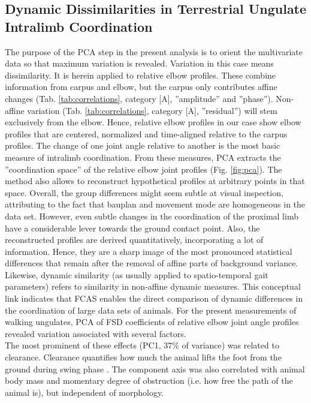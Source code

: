 \documentclass[10pt, a4paper]{article}
\begin{document}
\begin{linenumbers}[1]
\subsection*{Dynamic Dissimilarities in Terrestrial Ungulate Intralimb Coordination}
The purpose of the PCA step in the present analysis is to orient the multivariate data so that maximum variation is revealed. 
Variation in this case means dissimilarity. 
It is herein applied to relative elbow profiles. 
These combine information from carpus and elbow, but the carpus only contributes affine changes (Tab. \ref{tab:correlations}, category [A], ''amplitude'' and ''phase'').  
Non-affine variation (Tab. \ref{tab:correlations}, category [A], ''residual'') will stem exclusively from the elbow. 
Hence, relative elbow profiles in our case show elbow profiles that are centered, normalized and time-aligned relative to the carpus profiles. 
The change of one joint angle relative to another is the most basic measure of intralimb coordination. 
From these measures, PCA extracts the ''coordination space'' of the relative elbow joint profiles (Fig. \ref{fig:pca}). 
The method also allows to reconstruct hypothetical profiles at arbitrary points in that space. 
Overall, the group differences might seem subtle at visual inspection, attributing to the fact that bauplan and movement mode are homogeneous in the data set. 
However, even subtle changes in the coordination of the proximal limb have a considerable lever towards the ground contact point. 
Also, the reconstructed profiles are derived quantitatively, incorporating a lot of information. 
Hence, they are a sharp image of the most pronounced statistical differences that remain after the removal of affine parts of background variance. 
Likewise, dynamic similarity (as usually applied to spatio-temporal gait parameters) refers to similarity in non-affine dynamic measures. 
This conceptual link indicates that FCAS enables the direct comparison of dynamic differences in the coordination of large data sets of animals. 
For the present measurements of walking ungulates, PCA of FSD coefficients of relative elbow joint angle profiles revealed variation associated with several factors. 
\medskip\\The most prominent of these effects (PC1, $37\%$ of variance) was related to clearance. 
Clearance quantifies how much the animal lifts the foot from the ground during swing phase \citep{Austin1999,MacLellan2010,Perrot2011}. 
The component axis was also correlated with animal body mass and momentary degree of obstruction (i.e. how free the path of the animal is), but independent of morphology. 

\end{linenumbers}
\end{document}
